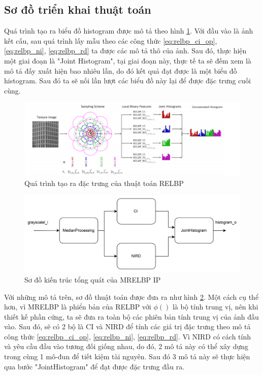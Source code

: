 \subsection{Sơ đồ triển khai thuật toán}
Quá trình tạo ra biểu đồ histogram được mô tả theo hình \ref{fig:histogramStep}. Với đầu vào là ảnh kết cấu, sau quá trình lấy mẫu theo các công thức \ref{eq:relbp_ci_op}, \ref{eq:relbp_ni}, \ref{eq:relbp_rd} ta được các mô tả thô của ảnh. Sau đó, thực hiện một giai đoạn là "Joint Histogram", tại giai đoạn này, thực tế ta sẽ đếm xem là mô tả đấy xuất hiện bao nhiêu lần, do đó kết quả đạt được là một biểu đồ histogram. Sau đó ta sẽ nối lần lượt các biểu đồ này lại để được đặc trưng cuối cùng. 

\begin{figure} [!ht]
	\centering
	\includegraphics[width= 1\linewidth]{figures/histogramStep.png}
	\caption{Quá trình tạo ra đặc trưng của thuật toán RELBP \cite{realTimeTexture}}
	\label{fig:histogramStep}
\end{figure} 


\begin{figure} [!ht]
	\centering
	\includegraphics[width= 1\linewidth]{figures/fullArch.png}
	\caption{Sơ đồ kiến trúc tổng quát của MRELBP IP}
	\label{fig:fullArch}
\end{figure} 


Với những mô tả trên, sơ đồ thuật toán được đưa ra như hình \ref{fig:fullArch}. Một cách cụ thể hơn, vì MRELBP là phiển bản của RELBP với $\phi()$ là bộ tính trung vị, nên khi thiết kế phần cứng, ta sẽ đưa ra toàn bộ các phiên bản tính trung vị của ảnh đầu vào. Sau đó, sẽ có 2 bộ là CI và NIRD để tính các giá trị đặc trưng theo mô tả công thức \ref{eq:relbp_ci_op}, \ref{eq:relbp_ni}, \ref{eq:relbp_rd}. Vì NIRD có cách tính và yêu cầu đầu vào tương đối giống nhau, do đó, 2 mô tả này có thể xây dựng trong cùng 1 mô-đun để tiết kiệm tài nguyên. Sau đó 3 mô tả này sẽ thực hiện qua bước "JointHistogram" để đạt được đặc trưng đầu ra.


